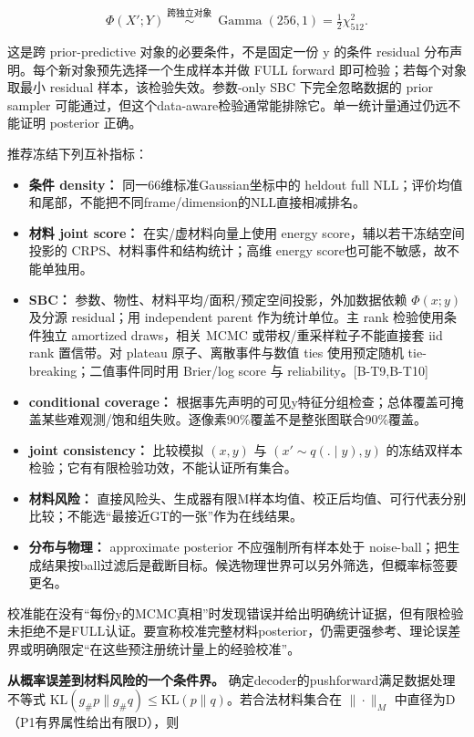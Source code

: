 \documentclass[
  11pt,
  a4paper,
]{article}
\providecommand{\tightlist}{%
  \setlength{\itemsep}{0pt}\setlength{\parskip}{0pt}}
\begin{document}
\[
\Phi(X';Y)\ \overset{\text{跨独立对象}}{\sim}\ \operatorname{Gamma}(256,1)=\tfrac12\chi^2_{512}.
\]

这是跨 prior-predictive 对象的必要条件，不是固定一份 y 的条件 residual
分布声明。每个新对象预先选择一个生成样本并做 FULL forward
即可检验；若每个对象取最小 residual 样本，该检验失效。参数-only SBC
下完全忽略数据的 prior sampler
可能通过，但这个data-aware检验通常能排除它。单一统计量通过仍远不能证明
posterior 正确。

推荐冻结下列互补指标：

\begin{itemize}
\tightlist
\item
  \textbf{条件 density：} 同一66维标准Gaussian坐标中的 heldout full
  NLL；评价均值和尾部，不能把不同frame/dimension的NLL直接相减排名。
\item
  \textbf{材料 joint score：} 在实/虚材料向量上使用 energy
  score，辅以若干冻结空间投影的 CRPS、材料事件和结构统计；高维 energy
  score也可能不敏感，故不能单独用。
\item
  \textbf{SBC：} 参数、物性、材料平均/面积/预定空间投影，外加数据依赖
  \(\Phi(x;y)\) 及分源 residual；用 independent parent 作为统计单位。主
  rank 检验使用条件独立 amortized draws，相关 MCMC
  或带权/重采样粒子不能直接套 iid rank 置信带。对 plateau
  原子、离散事件与数值 ties 使用预定随机 tie-breaking；二值事件同时用
  Brier/log score 与 reliability。{[}B-T9,B-T10{]}
\item
  \textbf{conditional coverage：}
  根据事先声明的可见y特征分组检查；总体覆盖可掩盖某些难观测/饱和组失败。逐像素90\%覆盖不是整张图联合90\%覆盖。
\item
  \textbf{joint consistency：} 比较模拟 \((x,y)\) 与
  \((x'\sim q(.\mid y),y)\)
  的冻结双样本检验；它有有限检验功效，不能认证所有集合。
\item
  \textbf{材料风险：}
  直接风险头、生成器有限M样本均值、校正后均值、可行代表分别比较；不能选``最接近GT的一张''作为在线结果。
\item
  \textbf{分布与物理：} approximate posterior 不应强制所有样本处于
  noise-ball；把生成结果按ball过滤后是截断目标。候选物理世界可以另外筛选，但概率标签要更名。
\end{itemize}

校准能在没有``每份y的MCMC真相''时发现错误并给出明确统计证据，但有限检验未拒绝不是FULL认证。要宣称校准完整材料posterior，仍需更强参考、理论误差界或明确限定``在这些预注册统计量上的经验校准''。

\textbf{从概率误差到材料风险的一个条件界。}
确定decoder的pushforward满足数据处理不等式
\(\mathrm{KL}(g_\#p\|g_\#q)\le\mathrm{KL}(p\|q)\)。若合法材料集合在
\(\|\cdot\|_M\) 中直径为D（P1有界属性给出有限D），则
\end{document}

